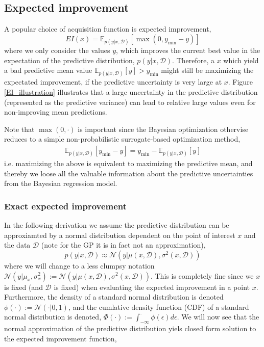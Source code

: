 \subsection{Expected improvement}
A popular choice of acquisition function is expected improvement, 
$$EI(x) = \mathbb{E}_{p(y|x,\mathcal{D})}[\max(0, y_{\min}-y)]$$ where we only consider the values
$y$, which improves the current best value in the expectation of the predictive distribution,
$p(y|x,\mathcal{D})$. Therefore, a $x$ which yield a bad predictive mean value
$\mathbb{E}_{p(y|x,\mathcal{D})}[y]> y_{\min}$ might still be maximizing the expectated improvement,
if the predictive uncertainty is very large at $x$. Figure \ref{EI_illustration} illustrates that a
large uncertainty in the predictive distribution (represented as the predictive variance) can lead
to relative large values even for non-improving mean predictions.


\begin{note2}    
    Note that $\max(0,\cdot)$ is important since the Bayesian optimization othervise reduces to
    a simple non-probabilistic surrogate-based optimization method,
    \begin{align*}
        \mathbb{E}_{p(y|x,\mathcal{D})}[y_{\min}-y] = y_{\min} - \mathbb{E}_{p(y|x,\mathcal{D})}[y]
    \end{align*}
    i.e. maximizing the above is equivalent to maximizing the predictive mean, and thereby we loose
    all the valuable information about the predictive uncertainties from the Bayesian regression model. 
\end{note2}

\subsubsection{Exact expected improvement} \label{ExactEI} 
In the following derivation we assume the
predictive distribution can be approxiamted by a normal distribution dependent on the point of
interest $x$ and the data $\mathcal{D}$ (note for the GP it is in fact not an approximation), 
$$p(y|x,\mathcal{D}) \approx \mathcal{N}(y|\mu(x,\mathcal{D}), \sigma^2(x,\mathcal{D}))$$ where we
will change to a less clumpsy notation $\mathcal{N}(y|\mu_x,
\sigma^2_x):=\mathcal{N}(y|\mu(x,\mathcal{D}), \sigma^2(x,\mathcal{D}))$. This is completely fine
since we $x$ is fixed (and $\mathcal{D}$ is fixed) when evaluating the expected improvement in a point
$x$. %
Furthermore, the density of
a standard normal distribution is denoted $\phi(\cdot):=\mathcal{N}(\cdot | 0,1)$, and the cumlative
density function (CDF) of a standard normal distribution is denoted, $\Phi(\cdot) :=
\int_{-\infty}^{\cdot} \phi(\epsilon)d\epsilon$. We will now see that the normal approximation
of the predictive distribution yiels closed form solution to the expected improvement function, 

